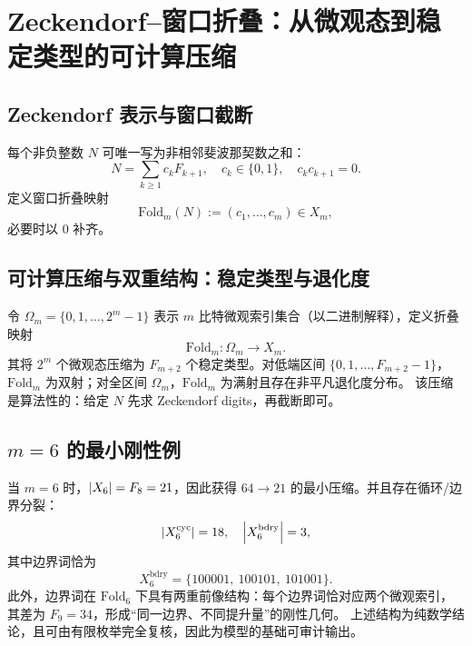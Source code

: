 \section{Zeckendorf--窗口折叠：从微观态到稳定类型的可计算压缩}

\subsection{Zeckendorf 表示与窗口截断}

每个非负整数 $N$ 可唯一写为非相邻斐波那契数之和：
\[
N=\sum_{k\ge 1}c_k F_{k+1},\quad c_k\in\{0,1\},\quad c_kc_{k+1}=0.
\]
定义窗口折叠映射
\[
\mathrm{Fold}_m(N):=(c_1,\dots,c_m)\in X_m,
\]
必要时以 $0$ 补齐。

\subsection{可计算压缩与双重结构：稳定类型与退化度}

令 $\Omega_m=\{0,1,\dots,2^m-1\}$ 表示 $m$ 比特微观索引集合（以二进制解释），定义折叠映射
\[
\mathrm{Fold}_m:\Omega_m\to X_m.
\]
其将 $2^m$ 个微观态压缩为 $F_{m+2}$ 个稳定类型。对低端区间 $\{0,1,\dots,F_{m+2}-1\}$，$\mathrm{Fold}_m$ 为双射；对全区间 $\Omega_m$，$\mathrm{Fold}_m$ 为满射且存在非平凡退化度分布。
该压缩是算法性的：给定 $N$ 先求 Zeckendorf digits，再截断即可。

\subsection{\texorpdfstring{$m=6$}{m=6} 的最小刚性例}

当 $m=6$ 时，$\left\lvert X_6\right\rvert=F_8=21$，因此获得 $64\to 21$ 的最小压缩。并且存在循环/边界分裂：
\[
\left\lvert X_6^{\mathrm{cyc}}\right\rvert=18,\quad \left\lvert X_6^{\mathrm{bdry}}\right\rvert=3,
\]
其中边界词恰为
\[
X_6^{\mathrm{bdry}}=\{100001,\ 100101,\ 101001\}.
\]
此外，边界词在 $\mathrm{Fold}_6$ 下具有两重前像结构：每个边界词恰对应两个微观索引，其差为 $F_9=34$，形成“同一边界、不同提升量”的刚性几何。
上述结构为纯数学结论，且可由有限枚举完全复核，因此为模型的基础可审计输出。

